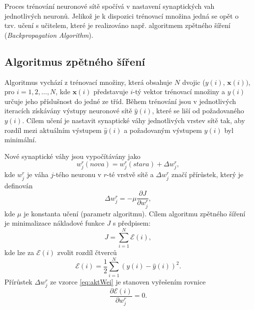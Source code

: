 {\par{Proces trénování neuronové sítě spočívá v nastavení synaptických vah jednotlivých neuronů. Jelikož je k dispozici trénovací množina jedná se opět o tzv. učení s učitelem, které je realizováno např. algoritmem zpětného šíření (\textit{Backpropagation Algorithm}).}

\subsection*{Algoritmus zpětného šíření}
\par{Algoritmus vychází z trénovací množiny, která obsahuje $N$ dvojic ($y\left( i\right)$, $\bm{x}\left( i\right))$, pro $i = 1, 2, \ldots, N$, kde $\bm{x}\left( i\right)$ představuje $i$-tý vektor trénovací množiny a $y\left( i\right)$ určuje jeho příslušnost do jedné ze tříd. Během trénování jsou v jednotlivých iteracích získávány výstupy neuronové sítě $\hat{y}\left( i\right)$,
které se liší od požadovaného $y\left( i\right)$. Cílem učení je nastavit synaptické váhy jednotlivých vrstev sítě tak, aby rozdíl mezi aktuálním výstupem $\hat{y}\left( i\right)$ a požadovaným výstupem $y\left( i\right)$ byl minimální.}

\par{Nové synaptické váhy jsou vypočítávány jako
\begin{equation}
	w_j^r\left(nova\right)=w_j^r\left(stara\right)+\Delta w_j^r, \label{eq:aktWei}
\end{equation}
kde $w_j^r$ je váha $j$-tého neuronu v $r$-té vrstvě sítě a $\Delta w_j^r$ značí přírůstek, který je definován
\begin{equation}
	\Delta w_j^r=-\mu\frac{\partial J}{\partial w_j^r},
\end{equation}
kde $\mu$ je konstanta učení (parametr algoritmu). Cílem algoritmu zpětného šíření je minimalizace nákladové funkce $J$ s předpisem:
\begin{equation}
	J=\sum_{i=1}^N\mathcal{E}\left(i\right), \label{eq:energyJ}
\end{equation}
kde lze za $\mathcal{E}\left(i\right)$ zvolit rozdíl čtverců
\begin{equation}
	\mathcal{E}\left(i\right)=\frac{1}{2}\sum_{i=1}^N\left(y\left(i\right)-\hat{y}\left(i\right)\right)^2.
\end{equation}
Přírůstek $\Delta w_j^r$ ze vzorce \ref{eq:aktWei} je stanoven vyřešením rovnice
\begin{equation}
	\frac{\partial \mathcal{E}\left(i\right)}{\partial w_j^r}=0. \label{eq:grad}
\end{equation}}

}
